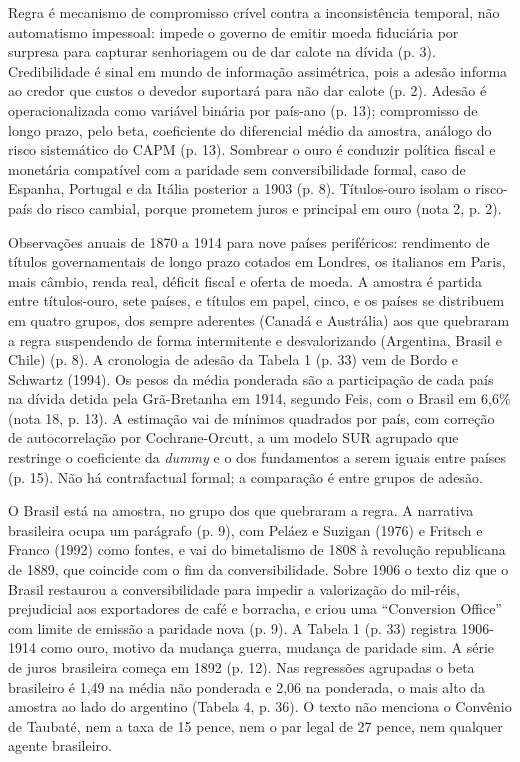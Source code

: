 Regra é mecanismo de compromisso crível contra a inconsistência temporal, não
automatismo impessoal: impede o governo de emitir moeda fiduciária por surpresa
para capturar senhoriagem ou de dar calote na dívida (p. 3). Credibilidade é
sinal em mundo de informação assimétrica, pois a adesão informa ao credor que
custos o devedor suportará para não dar calote (p. 2). Adesão é operacionalizada
como variável binária por país-ano (p. 13); compromisso de longo prazo, pelo
beta, coeficiente do diferencial médio da amostra, análogo do risco sistemático
do CAPM (p. 13). Sombrear o ouro é conduzir política fiscal e monetária
compatível com a paridade sem conversibilidade formal, caso de Espanha,
Portugal e da Itália posterior a 1903 (p. 8). Títulos-ouro isolam o risco-país
do risco cambial, porque prometem juros e principal em ouro (nota 2, p. 2).

Observações anuais de 1870 a 1914 para nove países periféricos: rendimento de
títulos governamentais de longo prazo cotados em Londres, os italianos em Paris,
mais câmbio, renda real, déficit fiscal e oferta de moeda. A amostra é partida
entre títulos-ouro, sete países, e títulos em papel, cinco, e os países se
distribuem em quatro grupos, dos sempre aderentes (Canadá e Austrália) aos que
quebraram a regra suspendendo de forma intermitente e desvalorizando (Argentina,
Brasil e Chile) (p. 8). A cronologia de adesão da Tabela 1 (p. 33) vem de Bordo
e Schwartz (1994). Os pesos da média ponderada são a participação de cada país
na dívida detida pela Grã-Bretanha em 1914, segundo Feis, com o Brasil em 6,6\%
(nota 18, p. 13). A estimação vai de mínimos quadrados por país, com correção de
autocorrelação por Cochrane-Orcutt, a um modelo SUR agrupado que restringe o
coeficiente da \emph{dummy} e o dos fundamentos a serem iguais entre países
(p. 15). Não há contrafactual formal; a comparação é entre grupos de adesão.

O Brasil está na amostra, no grupo dos que quebraram a regra. A narrativa
brasileira ocupa um parágrafo (p. 9), com Peláez e Suzigan (1976) e Fritsch e
Franco (1992) como fontes, e vai do bimetalismo de 1808 à revolução republicana
de 1889, que coincide com o fim da conversibilidade. Sobre 1906 o texto diz que
o Brasil restaurou a conversibilidade para impedir a valorização do mil-réis,
prejudicial aos exportadores de café e borracha, e criou uma ``Conversion
Office'' com limite de emissão a paridade nova (p. 9). A Tabela 1 (p. 33)
registra 1906-1914 como ouro, motivo da mudança guerra, mudança de paridade sim.
A série de juros brasileira começa em 1892 (p. 12). Nas regressões agrupadas o
beta brasileiro é 1,49 na média não ponderada e 2,06 na ponderada, o mais alto
da amostra ao lado do argentino (Tabela 4, p. 36). O texto não menciona o
Convênio de Taubaté, nem a taxa de 15 pence, nem o par legal de 27 pence, nem
qualquer agente brasileiro.

